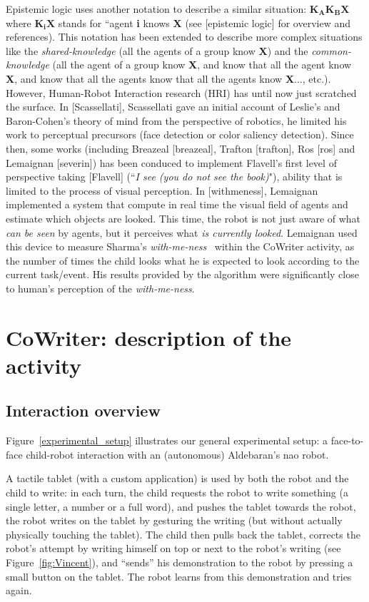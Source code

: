 \documentclass[10pt,a4paper,twocolumn]{article}
\begin{document}
Epistemic logic uses another notation to describe a similar situation: $\textbf{K}_{\textbf{A}}\textbf{K}_{\textbf{B}}\textbf{X}$ where $\textbf{K}_{\textbf{i}}\textbf{X}$ stands for ``agent \textbf{i} knows \textbf{X} (see [epistemic logic] for overview and references). This notation has been extended to describe more complex situations like the \textit{shared-knowledge} (all the agents of a group know \textbf{X}) and the \textit{common-knowledge} (all the agent of a group know \textbf{X}, and know that all the agent know \textbf{X}, and know that all the agents know that all the agents know \textbf{X}..., etc.). 
However, Human-Robot Interaction research (HRI) has until now just scratched the surface. In [Scassellati], Scassellati gave an initial account of Leslie's and Baron-Cohen's theory of mind from the perspective of robotics, he limited his work to perceptual precursors (face detection or color saliency detection). Since then, some works (including Breazeal [breazeal], Trafton [trafton], Ros [ros] and Lemaignan [severin]) has been conduced to implement Flavell's first level of perspective taking [Flavell] (``\textit{I see (you do not see the book)}"), ability that is limited to the process of visual perception.
In [withmeness], Lemaignan implemented a system that compute in real time the visual field of agents and estimate which objects are looked. This time, the robot is not just aware of what \textit{can be seen} by agents, but it perceives what \textit{is currently looked}. Lemaignan used this device to measure Sharma's \textit{with-me-ness}~\cite{sharma2014me} within the CoWriter activity, as the number of times the child looks what he is expected to look according to the current task/event. His results provided by the algorithm were significantly close to human's perception of the \textit{with-me-ness}.


\section{CoWriter: description of the activity}
\subsection{Interaction overview}
Figure~\ref{experimental_setup} illustrates our general experimental setup: a
face-to-face child-robot interaction with an (autonomous) Aldebaran's {\sc nao}
robot.

A tactile tablet (with a custom application) is used by both the robot and the
child to write: in each turn, the child requests the robot to write
something (a single letter, a number or a full word), and pushes the tablet
towards the robot, the robot writes on the tablet by gesturing the writing (but
without actually physically touching the tablet). The child then pulls back the
tablet, corrects the robot's attempt by writing himself on top or next to
the robot's writing (see Figure~\ref{fig:Vincent}), and ``sends'' his
demonstration to the robot by pressing a small button on the tablet. The robot
learns from this demonstration and tries again.
\end{document}
